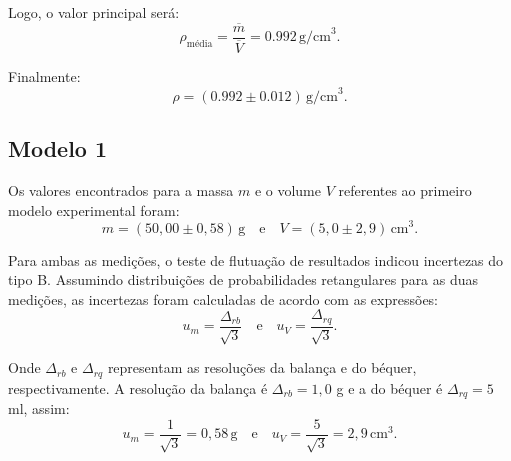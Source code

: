 \documentclass{article}
\begin{document}
\begin{multicols*}{2}
        Logo, o valor principal será:
\begin{equation}
\rho_{\text{média}} = \frac{\overline{m}}{\overline{V}} = 0.992 \, \text{g/cm}^3.
\end{equation}

Finalmente:
\begin{equation}
\rho = (0.992 \pm 0.012) \, \text{g/cm}^3.
\end{equation}

        
    \subsection{Modelo 1}
    Os valores encontrados para a massa \(m\) e o volume \(V\) referentes ao primeiro modelo experimental foram:
    \begin{equation}
    m = (50,00 \pm 0,58) \, \text{g} \quad \text{e} \quad V = (5,0 \pm 2,9) \, \text{cm}^3. \tag{9}
    \end{equation}
    
    Para ambas as medições, o teste de flutuação de resultados indicou incertezas do tipo B. Assumindo distribuições de probabilidades retangulares para as duas medições, as incertezas foram calculadas de acordo com as expressões:
    \begin{equation}
    u_m = \frac{\Delta_{rb}}{\sqrt{3}} \quad \text{e} \quad u_V = \frac{\Delta_{rq}}{\sqrt{3}}. \tag{10}
    \end{equation}
    
    Onde \(\Delta_{rb}\) e \(\Delta_{rq}\) representam as resoluções da balança e do béquer, respectivamente. A resolução da balança é \(\Delta_{rb} = 1,0\) g e a do béquer é \(\Delta_{rq} = 5\) ml, assim:
    \begin{equation}
    u_m = \frac{1}{\sqrt{3}} = 0,58 \, \text{g} \quad \text{e} \quad u_V = \frac{5}{\sqrt{3}} = 2,9 \, \text{cm}^3. \tag{11}
    \end{equation}
        
    \end{multicols*} %
    
    
\end{document}
